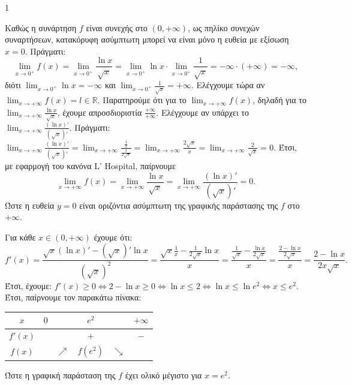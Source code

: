 \begin{ylh}{1}
    \item [Ύλη από εικόνα]
\end{ylh}
\begin{alist}
    \item Καθώς η συνάρτηση $f$ είναι συνεχής στο $(0, +\infty)$, ως πηλίκο συνεχών συναρτήσεων, κατακόρυφη ασύμπτωτη μπορεί να είναι μόνο η ευθεία με εξίσωση $x = 0$.
    Πράγματι:
    \[ \lim_{x \to 0^+} f(x) = \lim_{x \to 0^+} \frac{\ln x}{\sqrt{x}} = \lim_{x \to 0^+} \ln x \cdot \lim_{x \to 0^+} \frac{1}{\sqrt{x}} = -\infty \cdot (+\infty) = -\infty, \]
    διότι $\lim_{x \to 0^+} \ln x = -\infty$ και $\lim_{x \to 0^+} \frac{1}{\sqrt{x}} = +\infty$.
    Ελέγχουμε τώρα αν $\lim_{x \to +\infty} f(x) = l \in \mathbb{R}$.
    Παρατηρούμε ότι για το $\lim_{x \to +\infty} f(x)$, δηλαδή για το $\lim_{x \to +\infty} \frac{\ln x}{\sqrt{x}}$, έχουμε απροσδιοριστία $\frac{+\infty}{+\infty}$.
    Ελέγχουμε αν υπάρχει το $\lim_{x \to +\infty} \frac{(\ln x)'}{(\sqrt{x})'}$.
    Πράγματι: $\lim_{x \to +\infty} \frac{(\ln x)'}{(\sqrt{x})'} = \lim_{x \to +\infty} \frac{\frac{1}{x}}{\frac{1}{2\sqrt{x}}} = \lim_{x \to +\infty} \frac{2\sqrt{x}}{x} = \lim_{x \to +\infty} \frac{2}{\sqrt{x}} = 0$.
    Έτσι, με εφαρμογή του κανόνα L' Hospital, παίρνουμε
    \[ \lim_{x \to +\infty} f(x) = \lim_{x \to +\infty} \frac{\ln x}{\sqrt{x}} = \lim_{x \to +\infty} \frac{(\ln x)'}{(\sqrt{x})'} = 0. \]
    Ώστε η ευθεία $y = 0$ είναι οριζόντια ασύμπτωτη της γραφικής παράστασης της $f$ στο $+\infty$.

    \item Για κάθε $x \in (0, +\infty)$ έχουμε ότι:
    \[ f'(x) = \frac{\sqrt{x}(\ln x)' - (\sqrt{x})' \ln x}{(\sqrt{x})^2} = \frac{\sqrt{x} \frac{1}{x} - \frac{1}{2\sqrt{x}} \ln x}{x} = \frac{\frac{1}{\sqrt{x}} - \frac{\ln x}{2\sqrt{x}}}{x} = \frac{\frac{2 - \ln x}{2\sqrt{x}}}{x} = \frac{2 - \ln x}{2x\sqrt{x}}. \]
    Έτσι, έχουμε: $f'(x) \ge 0 \iff 2 - \ln x \ge 0 \iff \ln x \le 2 \iff \ln x \le \ln e^2 \iff x \le e^2$.
    Έτσι, παίρνουμε τον παρακάτω πίνακα:
    \begin{center}
    \begin{tabular}{|c||c|c|c|}
    \hline
    $x$ & $0$ & $e^2$ & $+\infty$ \\
    \hline
    $f'(x)$ & & $+$ & $-$ \\
    \hline
    $f(x)$ & & $\nearrow \quad f(e^2) \quad \searrow$ & \\
    \hline
    \end{tabular}
    \end{center}
    Ώστε η γραφική παράσταση της $f$ έχει ολικό μέγιστο για $x = e^2$.


\end{alist}
